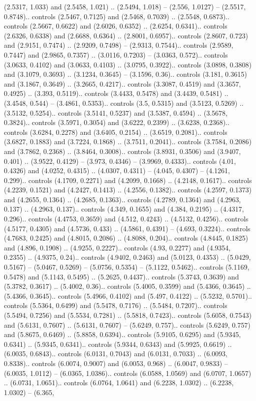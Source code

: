 (2.5317, 1.033) and (2.5458, 1.021) .. (2.5494, 1.018) -- (2.556, 1.0127) -- (2.5517, 0.8748).. controls (2.5467, 0.7125) and (2.5468, 0.7039) .. (2.5548, 0.6873).. controls (2.5667, 0.6622) and (2.6026, 0.6352) .. (2.6254, 0.6341).. controls (2.6326, 0.6338) and (2.6688, 0.6364) .. (2.8001, 0.6957).. controls (2.8607, 0.723) and (2.9151, 0.7474) .. (2.9209, 0.7498) -- (2.9313, 0.7544).. controls (2.9589, 0.7447) and (2.9865, 0.7357) .. (3.0116, 0.7203) -- (3.0363, 0.572).. controls (3.0633, 0.4102) and (3.0633, 0.4103) .. (3.0795, 0.3922).. controls (3.0898, 0.3808) and (3.1079, 0.3693) .. (3.1234, 0.3645) -- (3.1596, 0.36).. controls (3.181, 0.3615) and (3.1867, 0.3649) .. (3.2665, 0.4217).. controls (3.3087, 0.4519) and (3.3657, 0.4925) .. (3.393, 0.5119).. controls (3.4433, 0.5478) and (3.4439, 0.5481) .. (3.4548, 0.544) -- (3.4861, 0.5353).. controls (3.5, 0.5315) and (3.5123, 0.5269) .. (3.5132, 0.5254).. controls (3.5141, 0.5237) and (3.5387, 0.4594) .. (3.5678, 0.3824).. controls (3.5971, 0.3054) and (3.6222, 0.2399) .. (3.6238, 0.2368).. controls (3.6284, 0.2278) and (3.6405, 0.2154) .. (3.6519, 0.2081).. controls (3.6827, 0.1883) and (3.7224, 0.1868) .. (3.7511, 0.2041).. controls (3.7584, 0.2086) and (3.7862, 0.2368) .. (3.8464, 0.3008).. controls (3.8931, 0.3506) and (3.9407, 0.401) .. (3.9522, 0.4129) -- (3.973, 0.4346) -- (3.9969, 0.4333).. controls (4.01, 0.4326) and (4.0252, 0.4315) .. (4.0307, 0.4311) -- (4.045, 0.4307) -- (4.1261, 0.299).. controls (4.1709, 0.2271) and (4.2099, 0.1668) .. (4.2148, 0.1617).. controls (4.2239, 0.1521) and (4.2427, 0.1413) .. (4.2556, 0.1382).. controls (4.2597, 0.1373) and (4.2655, 0.1364) .. (4.2685, 0.1363).. controls (4.2789, 0.1364) and (4.2963, 0.137) .. (4.2963, 0.137).. controls (4.349, 0.1655) and (4.384, 0.2195) .. (4.4317, 0.296).. controls (4.4753, 0.3659) and (4.512, 0.4243) .. (4.5132, 0.4256).. controls (4.5177, 0.4305) and (4.5736, 0.433) .. (4.5861, 0.4391) -- (4.693, 0.3224).. controls (4.7683, 0.2425) and (4.8015, 0.2086) .. (4.8088, 0.204).. controls (4.8445, 0.1825) and (4.896, 0.1908) .. (4.9255, 0.2227).. controls (4.93, 0.2277) and (4.9354, 0.2355) .. (4.9375, 0.24).. controls (4.9402, 0.2463) and (5.0123, 0.4353) .. (5.0429, 0.5167) -- (5.0467, 0.5269) -- (5.0756, 0.5354) -- (5.1122, 0.5462).. controls (5.1169, 0.5478) and (5.1143, 0.5495) .. (5.2625, 0.4437).. controls (5.3743, 0.3639) and (5.3782, 0.3617) .. (5.4002, 0.36).. controls (5.4005, 0.3599) and (5.4366, 0.3645) .. (5.4366, 0.3645).. controls (5.4966, 0.4102) and (5.497, 0.4122) .. (5.5232, 0.5701).. controls (5.5364, 0.6499) and (5.5478, 0.7176) .. (5.5484, 0.7207).. controls (5.5494, 0.7256) and (5.5534, 0.7281) .. (5.5818, 0.7423).. controls (5.6058, 0.7543) and (5.6131, 0.7607) .. (5.6131, 0.7607) -- (5.6249, 0.757).. controls (5.6249, 0.757) and (5.8675, 0.6469) .. (5.8858, 0.6394).. controls (5.9105, 0.6295) and (5.9345, 0.6341) .. (5.9345, 0.6341).. controls (5.9344, 0.6343) and (5.9925, 0.6619) .. (6.0035, 0.6843).. controls (6.0131, 0.7043) and (6.0131, 0.7033) .. (6.0093, 0.8338).. controls (6.0074, 0.9007) and (6.0053, 0.968) .. (6.0047, 0.9833) -- (6.0035, 1.0112) -- (6.0365, 1.0386).. controls (6.0588, 1.0569) and (6.0707, 1.0657) .. (6.0731, 1.0651).. controls (6.0764, 1.0641) and (6.2238, 1.0302) .. (6.2238, 1.0302) -- (6.365, 